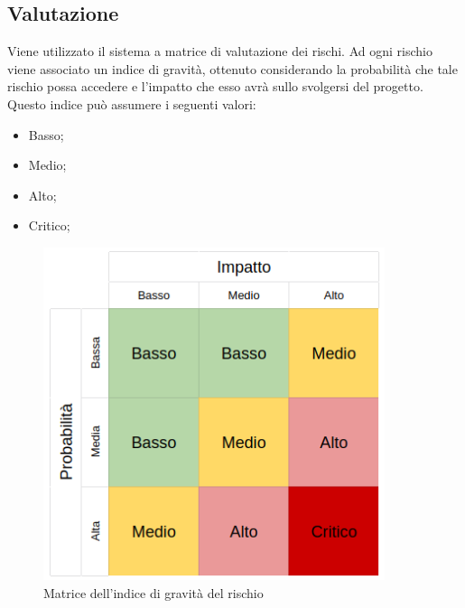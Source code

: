 \documentclass[../piano-di-progetto.tex]{subfiles}
\begin{document}
\subsection{Valutazione}
Viene utilizzato il sistema a matrice di valutazione dei rischi. Ad ogni rischio viene associato un indice di gravità, ottenuto considerando la probabilità che tale rischio possa accedere e l'impatto che esso avrà sullo svolgersi del progetto. Questo indice può assumere i seguenti valori:
\begin{itemize}
    \item Basso;
    \item Medio;
    \item Alto;
    \item Critico;
\end{itemize}
\begin{figure}[H]
	\centering
	\includegraphics[width=10cm]{img/matrice-rischio.png}
	\caption{Matrice dell'indice di gravità del rischio}
	\label{fig:matrice-rischio}
  \end{figure}
\end{document}
